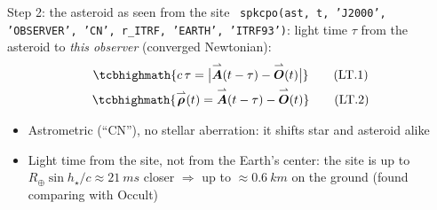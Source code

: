 \begin{frame}{Step 2: the asteroid as seen from the site}
  \SP\ \texttt{spkcpo(ast, t, 'J2000', 'OBSERVER', 'CN', r\_ITRF, 'EARTH', 'ITRF93')}:
  light time $\tau$ from the asteroid to \emph{this observer} (converged Newtonian):
  \begin{gather*}
    \tcbhighmath{c\,\tau = \bigl|\vv{A}(t - \tau) - \vv{O}(t)\bigr|} \tag{LT.1} \\
    \tcbhighmath{\vv{\rho}(t) = \vv{A}(t - \tau) - \vv{O}(t)} \tag{LT.2}
  \end{gather*}
  \begin{itemize}
    \item Astrometric (``CN''), no stellar aberration: it shifts star and asteroid alike
    \item Light time from the site, not from the Earth's center: the site is up to
          $R_\oplus \sin h_\star / c \approx \SI{21}{ms}$ closer
          $\Rightarrow$ up to $\approx\SI{0.6}{km}$ on the ground
          {\small(found comparing with Occult)}
  \end{itemize}
\end{frame}

\ifdefined\BesselianShown\else\fi


